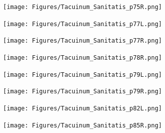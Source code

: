 \documentclass[letterpaper,11pt,leqno]{article}
\begin{document}
\begin{figure}[!htb]
	\centering
	\texttt{[image: Figures/Tacuinum\_Sanitatis\_p75R.png]}
	\caption{\citep[page 75 Right]{TacSan}}
\end{figure}

\begin{figure}[!htb]
	\centering
	\texttt{[image: Figures/Tacuinum\_Sanitatis\_p77L.png]}
	\caption{\citep[page 77 Left]{TacSan}}
\end{figure}

\begin{figure}[!htb]
	\centering
	\texttt{[image: Figures/Tacuinum\_Sanitatis\_p77R.png]}
	\caption{\citep[page 77 Right]{TacSan}}
\end{figure}

\begin{figure}[!htb]
	\centering
	\texttt{[image: Figures/Tacuinum\_Sanitatis\_p78R.png]}
	\caption{\citep[page 78 Right]{TacSan}}
\end{figure}

\begin{figure}[!htb]
	\centering
	\texttt{[image: Figures/Tacuinum\_Sanitatis\_p79L.png]}
	\caption{\citep[page 79 Left]{TacSan}}
\end{figure}

\begin{figure}[!htb]
	\centering
	\texttt{[image: Figures/Tacuinum\_Sanitatis\_p79R.png]}
	\caption{\citep[page 79 Right]{TacSan}}
\end{figure}

\begin{figure}[!htb]
	\centering
	\texttt{[image: Figures/Tacuinum\_Sanitatis\_p82L.png]}
	\caption{\citep[page 82 Left]{TacSan}}
\end{figure}

\begin{figure}[!htb]
	\centering
	\texttt{[image: Figures/Tacuinum\_Sanitatis\_p85R.png]}
	\caption{\citep[page 85 Right]{TacSan}}
\end{figure}
\end{document}
